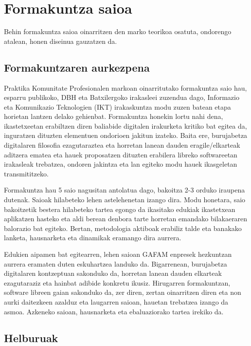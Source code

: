 \chapter{Formakuntza saioa}\label{cha:formakuntza}

Behin formakuntza saioa oinarritzen den marko teorikoa osatuta, ondorengo atalean, honen diseinua gauzatzen da. 

\section{Formakuntzaren aurkezpena}\label{hemendik aurrera ez dao labek gehixau, pereza maxima}

Praktika Komunitate Profesionalen markoan oinarritutako formakuntza saio hau, esparru publikoko, DBH eta Batxilergoko irakasleei zuzendua dago, Informazio eta Komunikazio Teknologien (IKT) irakaskuntza modu zuzen batean etapa horietan lantzen delako gehienbat. Formakuntza honekin lortu nahi dena, ikastetxeetan erabiltzen diren baliabide digitalen irakurketa kritiko bat egitea da, inguratzen dituzten elementuen ondorioen jakitun izateko. Baita ere, burujabetza digitalaren filosofia ezagutaraztea eta horretan lanean dauden eragile/elkarteak aditzera ematea eta hauek proposatzen dituzten erabilera libreko softwareetan irakasleak trebatzea, ondoren jakintza eta lan egiteko modu hauek ikasgeletan transmititzeko. 

Formakuntza hau 5 saio nagusitan antolatua dago, bakoitza 2-3 orduko iraupena dutenak. Saioak hilabeteko lehen astelehenetan izango dira. Modu honetara, saio bakoitzetik bestera hilabeteko tartea egongo da ikasitako edukiak ikastetxean aplikatzen hasteko eta aldi berean denbora tarte horretan emandako bilakaeraren balorazio bat egiteko. Bertan, metodologia aktiboak erabiliz talde eta banakako lanketa, hausnarketa eta dinamikak eramango dira aurrera.

Edukien aipamen bat egitearren, lehen saioan GAFAM enpresek hezkuntzan aurrera eramaten duten eskuhartzea landuko da. Bigarrenean, burujabetza digitalaren kontzeptuan sakonduko da, horretan lanean dauden elkarteak ezagutaraziz eta hainbat adibide konkretu ikusiz. Hirugarren formakuntzan, software libreen gaian sakonduko da, zer diren, zertan oinarritzen diren eta non aurki daitezkeen azalduz eta laugarren saioan, hauetan trebatzea izango da asmoa. Azkeneko saioan, hausnarketa eta ebaluaziorako tartea irekiko da.

\section{Helburuak}

